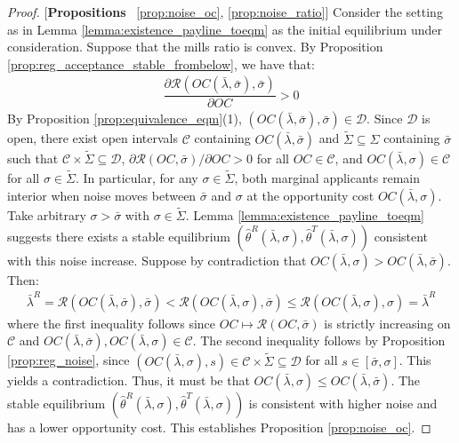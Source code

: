 \begin{proof}{[\textbf{Propositions} ~\ref{prop:noise_oc}, \ref{prop:noise_ratio}]} Consider the setting as in Lemma \ref{lemma:existence_payline_toeqm} as the initial equilibrium under consideration. Suppose that the mills ratio is convex. By Proposition \ref{prop:reg_acceptance_stable_frombelow}, we have that:
\begin{align*}
    \dfrac{\partial \mathcal{R}(OC(\bar{\lambda},\bar{\sigma}),\bar{\sigma})}{\partial OC} > 0
\end{align*}
By Proposition \ref{prop:equivalence_eqm}(1), $(OC(\bar{\lambda},\bar{\sigma}),\bar{\sigma})\in\mathcal{D}$. Since $\mathcal{D}$ is open, there exist open intervals $\mathcal{C}$ containing $OC(\bar{\lambda},\bar{\sigma})$ and $\tilde{\Sigma}\subseteq\Sigma$ containing $\bar{\sigma}$ such that $\mathcal{C}\times\tilde{\Sigma}\subseteq\mathcal{D}$, $\partial \mathcal{R}(OC,\bar{\sigma})/\partial OC >0$ for all $OC\in \mathcal{C}$, and $OC(\bar{\lambda},\sigma)\in \mathcal{C}$ for all $\sigma\in\tilde{\Sigma}$. In particular, for any $\sigma\in\tilde{\Sigma}$, both marginal applicants remain interior when noise moves between $\bar{\sigma}$ and $\sigma$ at the opportunity cost $OC(\bar{\lambda},\sigma)$. Take arbitrary $\sigma>\bar{\sigma}$ with $\sigma\in \tilde{\Sigma}$. Lemma \ref{lemma:existence_payline_toeqm} suggests there exists a stable equilibrium $(\hat{\theta}^R(\bar{\lambda},\sigma),\hat{\theta}^T(\bar{\lambda},\sigma))$ consistent with this noise increase. Suppose by contradiction that $OC(\bar{\lambda},\sigma) > OC(\bar{\lambda},\bar{\sigma})$. Then:
\begin{align*}
  \bar{\lambda}^R = \mathcal{R}(OC(\bar{\lambda},\bar{\sigma}),\bar{\sigma}) < \mathcal{R}(OC(\bar{\lambda},\sigma),\bar{\sigma}) \leq \mathcal{R}(OC(\bar{\lambda},\sigma),\sigma) = \bar{\lambda}^R
\end{align*}
where the first inequality follows since $OC\mapsto \mathcal{R}(OC,\bar{\sigma})$ is strictly increasing on $\mathcal{C}$ and $OC(\bar{\lambda},\bar{\sigma}),\allowbreak OC(\bar{\lambda},\sigma)\in \mathcal{C}$. The second inequality follows by Proposition \ref{prop:reg_noise}, since $(OC(\bar{\lambda},\sigma),s)\in\mathcal{C}\times\tilde{\Sigma}\subseteq\mathcal{D}$ for all $s\in[\bar{\sigma},\sigma]$. This yields a contradiction. Thus, it must be that $OC(\bar{\lambda},\sigma) \leq OC(\bar{\lambda},\bar{\sigma})$. The stable equilibrium $(\hat{\theta}^R(\bar{\lambda},\sigma),\hat{\theta}^T(\bar{\lambda},\sigma))$ is consistent with higher noise and has a lower opportunity cost. This establishes Proposition \ref{prop:noise_oc}. 


\end{proof}

